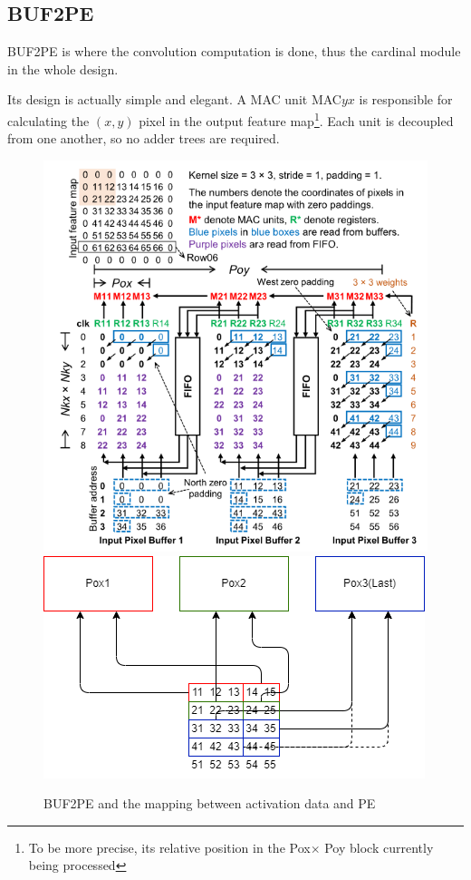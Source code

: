 \subsection{BUF2PE}

BUF2PE is where the convolution computation is done, thus the cardinal module in the whole design. 

Its design is actually simple and elegant. A MAC unit MAC$yx$ is responsible for calculating the $(x, y)$ pixel in the output feature map\footnote{To be more precise, its relative position in the Pox$\times$ Poy block currently being processed}. Each unit is decoupled from one another, so no adder trees are required. 

\begin{figure}
    \centering
    \includegraphics[width=0.8\columnwidth]{figures/BUF2PE.png}
    \includegraphics[width=0.8\columnwidth]{figures/act.png}
    \caption{BUF2PE and the mapping between activation data and PE}
\end{figure}

